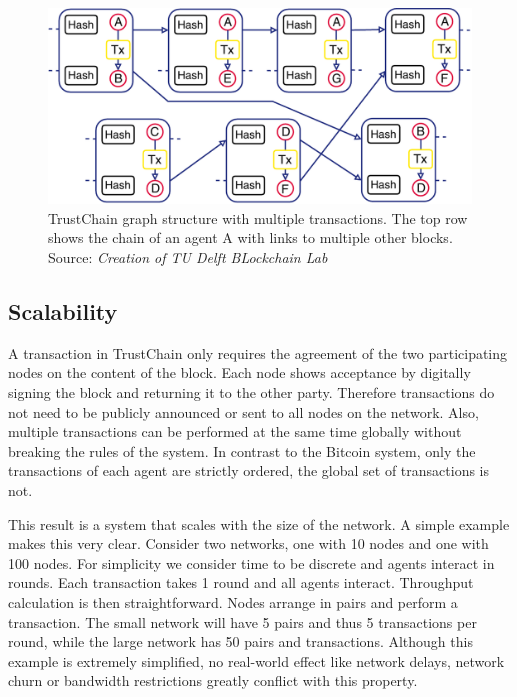 \begin{figure}
    \centering
    \includegraphics[width=\textwidth]{images/trustchain_graph.pdf}
    \caption{TrustChain graph structure with multiple transactions. The top row shows the chain of
    an agent A with links to multiple other blocks. Source: \textit{Creation of TU Delft BLockchain Lab}}
    \label{fig:trustchain_graph}
\end{figure}

\subsection{Scalability}
\label{sec:trustchain_scalability}
A transaction in TrustChain only requires the agreement of the two participating nodes on the content
of the block. Each node shows acceptance by digitally signing the block and returning it to the 
other party. Therefore transactions do not need to be publicly announced or sent to all nodes on
the network. Also, multiple transactions can be performed at the same time globally without breaking
the rules of the system. In contrast to the Bitcoin system, only the transactions of each agent are
strictly ordered, the global set of transactions is not.

This result is a system that scales with the size of the network. A simple example makes this very 
clear. Consider two networks, one with 10 nodes and one with 100 nodes. For simplicity we consider
time to be discrete and agents interact in rounds. Each transaction takes 1 round and all agents 
interact. Throughput calculation is then straightforward. Nodes arrange in pairs and perform a
transaction. The small network will have 5 pairs and thus 5 transactions per round, while the large
network has 50 pairs and transactions. Although this example is extremely simplified, no real-world
effect like network delays, network churn or bandwidth restrictions greatly conflict with this property.


